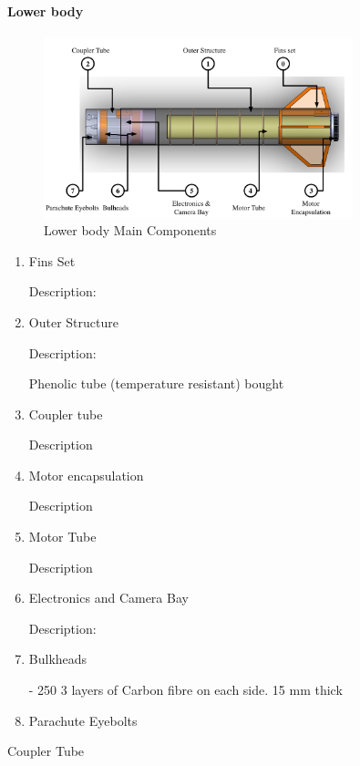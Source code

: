 
\paragraph{Lower body}



\begin{figure}[h!]%
\centering
 \includegraphics[width=0.8\textwidth]{images/PartsOfRocket}
 \caption{Lower body Main Components}
 \label{f:lower_body}
\end{figure}



\begin{enumerate}
\item Fins Set

Description:

\item Outer Structure

Description: 

Phenolic tube (temperature resistant) bought
\item Coupler tube

Description

\item Motor encapsulation

Description

\item Motor Tube

Description

\item Electronics and Camera Bay

Description:

\item Bulkheads 

- 250  3 layers of Carbon fibre on each side. 15 mm thick

\item Parachute Eyebolts



\end{enumerate}
Coupler Tube



